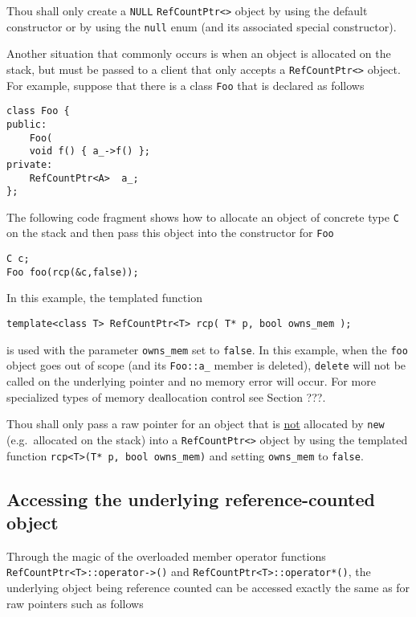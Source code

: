 \begin{commandment}
Thou shall only create a \texttt{NULL}
\texttt{RefCountPtr<>} object by using the default constructor
or by using the \texttt{null} enum (and its associated special
constructor).
\end{commandment}

Another situation that commonly occurs is when an object is allocated
on the stack, but must be passed to a client that only accepts a
\texttt{RefCountPtr<>} object.  For example, suppose that there is a
class \texttt{Foo} that is declared as follows
%
{\scriptsize\begin{verbatim}
class Foo {
public:
    Foo(
    void f() { a_->f() };
private:
    RefCountPtr<A>  a_;
};
\end{verbatim}}
%
The following code fragment shows how to allocate an object of concrete
type \texttt{C} on the stack and then pass this object into the constructor
for \texttt{Foo}
%
{\scriptsize\begin{verbatim}
C c;
Foo foo(rcp(&c,false));
\end{verbatim}}
%
In this example, the templated function
%
{\scriptsize\begin{verbatim}
template<class T> RefCountPtr<T> rcp( T* p, bool owns_mem );
\end{verbatim}}
%
\noindent{}is used with the parameter \texttt{owns\_mem} set to
\texttt{false}.  In this example, when the \texttt{foo} object
goes out of scope (and its \texttt{Foo::a\_} member is deleted),
\texttt{delete} will not be called on the underlying pointer and no
memory error will occur.  For more specialized types of memory
deallocation control see Section ???.

\begin{commandment}
Thou shall only pass a raw pointer for an object that is
\underline{not} allocated by \texttt{new} (e.g.~allocated on the stack) into a
\texttt{RefCountPtr<>} object by using the templated function
\texttt{rcp<T>(T* p, bool owns\_mem)} and setting \texttt{owns\_mem} to
\texttt{false}.
\end{commandment}

%
\subsection{Accessing the underlying reference-counted object}
%

Through the magic of the overloaded member operator functions
\texttt{RefCountPtr<T>::operator->()} and
\texttt{RefCountPtr<T>::operator*()}, the underlying object being reference
counted can be accessed exactly the same as for raw pointers such as
follows


